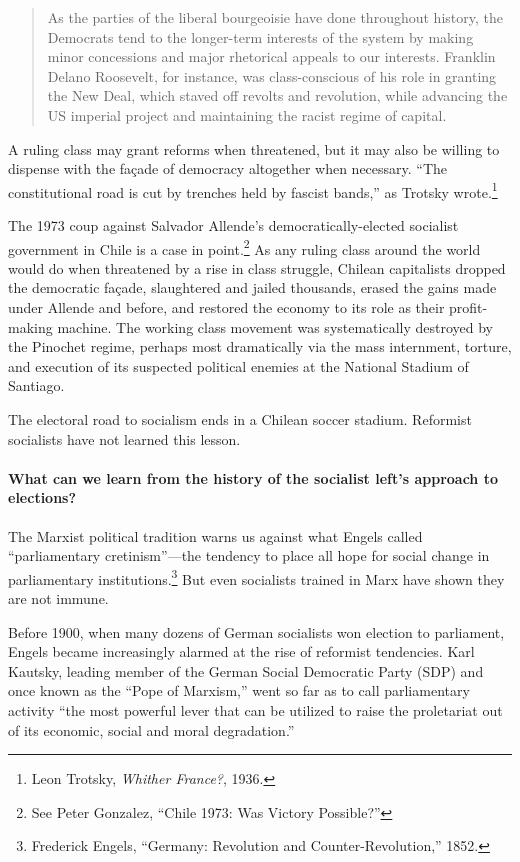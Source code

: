 \blockquote{As the parties of the liberal bourgeoisie have done throughout history, the Democrats tend to the longer-term interests of the system by making minor concessions and major rhetorical appeals to our interests. Franklin Delano Roosevelt, for instance, was class-conscious of his role in granting the New Deal, which staved off revolts and revolution, while advancing the US imperial project and maintaining the racist regime of capital.}

A ruling class may grant reforms when threatened, but it may also be willing to dispense with the fa\c{c}ade of democracy altogether when necessary. ``The constitutional road is cut by trenches held by fascist bands,'' as Trotsky wrote.\footnote{Leon Trotsky, \emph{Whither France?}, 1936.}

The 1973 coup against Salvador Allende's democratically-elected socialist government in Chile is a case in point.\footnote{See Peter Gonzalez, ``Chile 1973: Was Victory Possible?''} As any ruling class around the world would do when threatened by a rise in class struggle, Chilean capitalists dropped the democratic fa\c{c}ade, slaughtered and jailed thousands, erased the gains made under Allende and before, and restored the economy to its role as their profit-making machine. The working class movement was systematically destroyed by the Pinochet regime, perhaps most dramatically via the mass internment, torture, and execution of its suspected political enemies at the National Stadium of Santiago.

The electoral road to socialism ends in a Chilean soccer stadium. Reformist socialists have not learned this lesson.

\paragraph{What can we learn from the history of the socialist left's approach to elections?}

The Marxist political tradition warns us against what Engels called ``parliamentary cretinism''---the tendency to place all hope for social change in parliamentary institutions.\footnote{Frederick Engels, ``Germany: Revolution and Counter-Revolution,'' 1852.} But even socialists trained in Marx have shown they are not immune.

Before 1900, when many dozens of German socialists won election to parliament, Engels became increasingly alarmed at the rise of reformist tendencies. Karl Kautsky, leading member of the German Social Democratic Party (SDP) and once known as the ``Pope of Marxism,'' went so far as to call parliamentary activity ``the most powerful lever that can be utilized to raise the proletariat out of its economic, social and moral degradation.''

